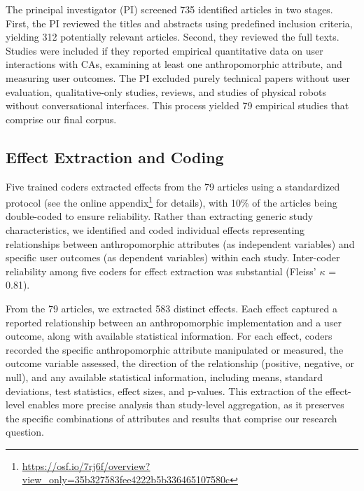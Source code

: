 \documentclass[sigconf,review,anonymous]{acmart}
\begin{document}
The principal investigator (PI) screened 735 identified articles in two stages. First, the PI reviewed the titles and abstracts using predefined inclusion criteria, yielding 312 potentially relevant articles. Second, they reviewed the full texts. Studies were included if they reported empirical quantitative data on user interactions with CAs, examining at least one anthropomorphic attribute, and measuring user outcomes. The PI excluded purely technical papers without user evaluation, qualitative-only studies, reviews, and studies of physical robots without conversational interfaces. This process yielded 79 empirical studies that comprise our final corpus.

\subsection{Effect Extraction and Coding}

Five trained coders extracted effects from the 79 articles using a standardized protocol (see the online appendix\footnote{\href{https://osf.io/7rj6f/overview?view_only=35b327583fee4222b5b336465107580c}{https://osf.io/7rj6f/overview?view\_only=35b327583fee4222b5b336465107580c}} for details), with 10\% of the articles being double-coded to ensure reliability. Rather than extracting generic study characteristics, we identified and coded individual effects representing relationships between anthropomorphic attributes (as independent variables) and specific user outcomes (as dependent variables) within each study. Inter-coder reliability among five coders for effect extraction was substantial (Fleiss' $\kappa$ = 0.81).

From the 79 articles, we extracted 583 distinct effects. Each effect captured a reported relationship between an anthropomorphic implementation and a user outcome, along with available statistical information. For each effect, coders recorded the specific anthropomorphic attribute manipulated or measured, the outcome variable assessed, the direction of the relationship (positive, negative, or null), and any available statistical information, including means, standard deviations, test statistics, effect sizes, and p-values. This extraction of the effect-level enables more precise analysis than study-level aggregation, as it preserves the specific combinations of attributes and results that comprise our research question.
\end{document}
